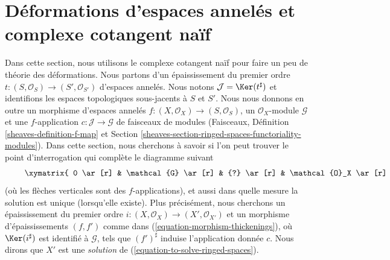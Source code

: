 \section{Déformations d'espaces annelés et complexe cotangent naïf}
\label{section-deformations-ringed-spaces}

\noindent
Dans cette section, nous utilisons le complexe cotangent naïf pour faire un peu
de théorie des déformations. Nous partons d'un épaississement du premier ordre
$t : (S, \mathcal{O}_S) \to (S', \mathcal{O}_{S'})$ d'espaces annelés.
Nous notons $\mathcal{J} = \Ker(t^\sharp)$ et identifions les espaces
topologiques sous-jacents à $S$ et $S'$.
Nous nous donnons en outre un morphisme d'espaces annelés
$f : (X, \mathcal{O}_X) \to (S, \mathcal{O}_S)$, un $\mathcal{O}_X$-module
$\mathcal{G}$ et une $f$-application $c : \mathcal{J} \to \mathcal{G}$
de faisceaux de modules (Faisceaux, Définition
\ref{sheaves-definition-f-map} et Section
\ref{sheaves-section-ringed-spaces-functoriality-modules}).
Dans cette section, nous cherchons à savoir si l'on peut trouver
le point d'interrogation qui complète le diagramme suivant
\begin{equation}
\label{equation-to-solve-ringed-spaces}
\vcenter{
\xymatrix{
0 \ar[r] & \mathcal{G} \ar[r] & {?} \ar[r] & \mathcal{O}_X \ar[r] & 0 \\
0 \ar[r] & \mathcal{J} \ar[u]^c \ar[r] & \mathcal{O}_{S'} \ar[u] \ar[r] &
\mathcal{O}_S \ar[u] \ar[r] & 0
}
}
\end{equation}
(où les flèches verticales sont des $f$-applications), et aussi dans quelle
mesure la solution est unique (lorsqu'elle existe). Plus précisément,
nous cherchons un épaississement du premier ordre
$i : (X, \mathcal{O}_X) \to (X', \mathcal{O}_{X'})$
et un morphisme d'épaississements $(f, f')$ comme dans
(\ref{equation-morphism-thickenings}), où $\Ker(i^\sharp)$ est identifié
à $\mathcal{G}$, tels que $(f')^\sharp$ induise l'application donnée $c$.
Nous dirons que $X'$ est une {\it solution} de
(\ref{equation-to-solve-ringed-spaces}).

